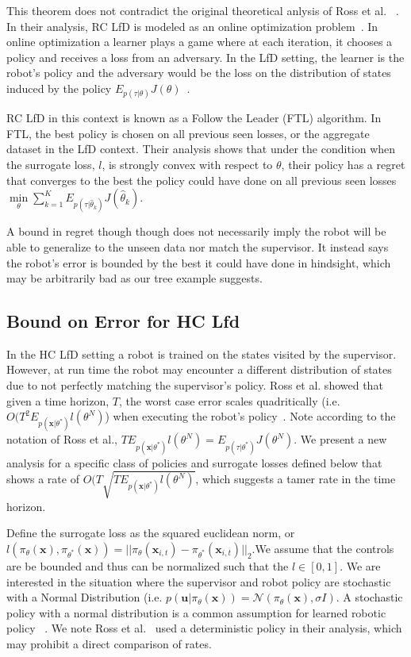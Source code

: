 \documentclass[10pt, conference]{ieeeconf}      %
\newcommand{\bu}{\mathbf{u}}
\newcommand{\bx}{\mathbf{x}}
\begin{document}
This theorem does not contradict the original theoretical anlysis of Ross et al. ~\cite{ross2010reduction}. In their analysis, RC LfD is modeled as an online optimization problem~\cite{ross2010reduction}.  In online optimization a learner plays a game where at each iteration, it chooses a policy and receives a loss from an adversary.  In the LfD setting, the learner is the robot's policy and the adversary would be the loss on the distribution of states induced by the policy $E_{p(\tau|\theta)} J(\theta)$~\cite{shalev2011online}.

RC LfD in this context is known as a Follow the Leader (FTL) algorithm. In FTL, the best policy is chosen on all previous seen losses, or the aggregate dataset in the LfD context. Their analysis shows that under the condition when the surrogate loss, $l$, is strongly convex with respect to $\theta$, their policy has a regret that converges to the best the policy could have done on all previous seen losses $\underset{\theta}{\min} \sum_{k=1}^K E_{p(\tau|\hat{\theta}_k)}J(\hat{\theta}_k)$. 

A bound in regret though though does not necessarily imply the robot will be able to generalize to the unseen data nor match the supervisor. It instead says the robot's error is bounded by the best it could have done in hindsight, which may be arbitrarily bad as our tree example suggests. 

\subsection{Bound on Error for HC Lfd}
In the HC LfD setting a robot is trained on the states visited by the supervisor. However, at run time the robot may encounter a different distribution of states due to not perfectly matching the supervisor's policy. Ross et al. showed that given a time horizon, $T$, the worst case error scales quadritically (i.e. $O(T^2E_{p(\bx|\theta^*)} l(\theta^N)$) when executing the robot's policy~\cite{ross2010efficient}. Note according to the notation of Ross et al., $TE_{p(\bx|\theta^*)} l(\theta^N) = E_{p(\tau|\theta^*)} J(\theta^N)$. We present a new analysis for a specific class of policies and surrogate losses defined below that shows a rate of $O(T\sqrt{TE_{p(\bx|\theta^*)} l(\theta^N)}$, which suggests a tamer rate in the time horizon. 

 Define the surrogate loss as the squared euclidean norm, or $l(\pi_{\theta}(\bx),\pi_{\theta^*}(\bx)) = ||\pi_{\theta}(\bx_{i,t}) - \pi_{\theta^*}(\bx_{i,t})||_2$.We assume that the controls are be bounded and thus can be normalized such that the $l \in [0,1]$.  We are interested in the situation where the supervisor and robot policy are stochastic with a Normal Distribution (i.e. $p(\bu|\pi_{\theta}(\bx)) = \mathcal{N}(\pi_\theta(\bx),\sigma I)$. A stochastic policy with a normal distribution is a common assumption for learned robotic policy ~\cite{levine2015end}. We note Ross et al.~\cite{ross2010reduction} used a deterministic policy in their analysis, which may prohibit a direct comparison of rates.
 
\end{document}
